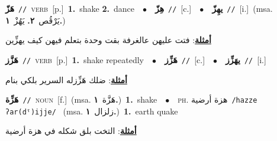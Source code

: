 \documentclass[10pt,a4paper,twoside]{article} %
\begin{document}
\begin{multicols}{2}
{\setlength\topsep{0pt}\textbf{\foreignlanguage{arabic}{هَزّ}}\ {\color{gray}\texttt{//}\color{black}}\ \textsc{verb}\ [p.]\ \textbf{1.}~shake  \textbf{2.}~dance\ \ $\bullet$\ \ \setlength\topsep{0pt}\textbf{\foreignlanguage{arabic}{هِزّ}}\ {\color{gray}\texttt{//}\color{black}}\ [c.]\ \ $\bullet$\ \ \setlength\topsep{0pt}\textbf{\foreignlanguage{arabic}{يهِزّ}}\ {\color{gray}\texttt{//}\color{black}}\ [i.]\ \color{gray}(msa. \foreignlanguage{arabic}{يَرْقُص}~\foreignlanguage{arabic}{\textbf{٢.}}  \foreignlanguage{arabic}{يَهُزْ}~\foreignlanguage{arabic}{\textbf{١.}})\color{black}\  \begin{flushright}\color{gray}\foreignlanguage{arabic}{\textbf{\underline{\foreignlanguage{arabic}{أمثلة}}}: فتت عليهن عالغرفة بقت وحدة بتعلم فيهن كيف يهزِّين}\end{flushright}\color{black}} \vspace{2mm}

{\setlength\topsep{0pt}\textbf{\foreignlanguage{arabic}{هَزَّز}}\ {\color{gray}\texttt{//}\color{black}}\ \textsc{verb}\ [p.]\ \textbf{1.}~shake repeatedly\ \ $\bullet$\ \ \setlength\topsep{0pt}\textbf{\foreignlanguage{arabic}{هَزِّز}}\ {\color{gray}\texttt{//}\color{black}}\ [c.]\ \ $\bullet$\ \ \setlength\topsep{0pt}\textbf{\foreignlanguage{arabic}{يهَزِّز}}\ {\color{gray}\texttt{//}\color{black}}\ [i.]\  \begin{flushright}\color{gray}\foreignlanguage{arabic}{\textbf{\underline{\foreignlanguage{arabic}{أمثلة}}}: ضلك هَزِّزله السرير بلكي بنام}\end{flushright}\color{black}} \vspace{2mm}

{\setlength\topsep{0pt}\textbf{\foreignlanguage{arabic}{هَزِّة}}\ {\color{gray}\texttt{//}\color{black}}\ \textsc{noun}\ [f.]\ \color{gray}(msa. \foreignlanguage{arabic}{هَزَّة}~\foreignlanguage{arabic}{\textbf{١.}})\color{black}\ \textbf{1.}~shake\ \ $\bullet$\ \ \textsc{ph.} \color{gray} \foreignlanguage{arabic}{هزة أرضية}\color{black}\ {\color{gray}\texttt{/{\sffamily hazze ʔar(dˤ)ijje}/}\color{black}}\ \color{gray} (msa. \foreignlanguage{arabic}{زلزال}~\foreignlanguage{arabic}{\textbf{١.}})\color{black}\ \textbf{1.}~earth quake\  \begin{flushright}\color{gray}\foreignlanguage{arabic}{\textbf{\underline{\foreignlanguage{arabic}{أمثلة}}}: التخت بلق شكله في هزة أرضية}\end{flushright}\color{black}} \vspace{2mm}


\end{multicols}
\end{document}
